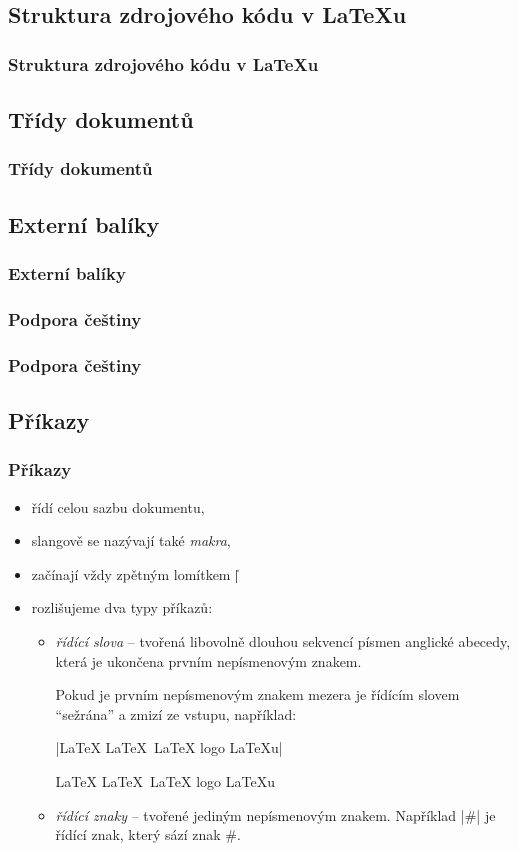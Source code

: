 \subsection{Struktura zdrojového kódu v \LaTeX{}u}
\begin{frame}
	\frametitle{Struktura zdrojového kódu v \LaTeX{}u}
\end{frame}


\subsection{Třídy dokumentů}
\begin{frame}
	\frametitle{Třídy dokumentů}
\end{frame}


\subsection{Externí balíky}
\begin{frame}
	\frametitle{Externí balíky}
\end{frame}


\subsubsection{Podpora češtiny}
\begin{frame}
	\frametitle{Podpora češtiny}
\end{frame}


\subsection{Příkazy}
\begin{frame}[fragile]
	\frametitle{Příkazy}
	\begin{itemize}
		\item řídí celou sazbu dokumentu,
		\item slangově se nazývají také \emph{makra},
		\item začínají vždy zpětným lomítkem |\|
		\item rozlišujeme dva typy příkazů:
			\begin{itemize}
				\item \emph{řídící slova} -- tvořená libovolně dlouhou sekvencí písmen anglické abecedy, která je ukončena prvním nepísmenovým znakem.\par
					Pokud je prvním nepísmenovým znakem mezera je řídícím slovem \enquote{sežrána} a zmizí ze vstupu, například:\par
					|\LaTeX{} \LaTeX\ {\LaTeX} logo \LaTeX u|\par \LaTeX{} \LaTeX\ {\LaTeX} logo \LaTeX u
				\item \emph{řídící znaky} -- tvořené jediným nepísmenovým znakem. Například |\#| je řídící znak, který sází znak \#.
			\end{itemize}
	\end{itemize}
\end{frame}


